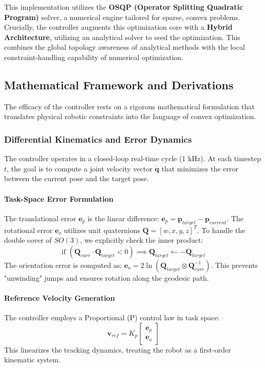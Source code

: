 \documentclass[12pt,a4paper]{report}
\begin{document}
This implementation utilizes the \textbf{OSQP (Operator Splitting Quadratic Program)} solver, a numerical engine tailored for sparse, convex problems. Crucially, the controller augments this optimization core with a \textbf{Hybrid Architecture}, utilizing an analytical solver \cite{EAIK} to seed the optimization. This combines the global topology awareness of analytical methods with the local constraint-handling capability of numerical optimization.

\subsection{Mathematical Framework and Derivations}
The efficacy of the controller rests on a rigorous mathematical formulation that translates physical robotic constraints into the language of convex optimization.

\subsubsection{Differential Kinematics and Error Dynamics}
The controller operates in a closed-loop real-time cycle (1 kHz). At each timestep $t$, the goal is to compute a joint velocity vector $\dot{\mathbf{q}}$ that minimizes the error between the current pose and the target pose.

\paragraph{Task-Space Error Formulation}
The translational error $\mathbf{e}_p$ is the linear difference: $\mathbf{e}_p = \mathbf{p}_{target} - \mathbf{p}_{current}$. The rotational error $\mathbf{e}_o$ utilizes unit quaternions $\mathbf{Q} = [w, x, y, z]^T$. To handle the double cover of $SO(3)$, we explicitly check the inner product:
\begin{equation}
    \text{if } (\mathbf{Q}_{curr} \cdot \mathbf{Q}_{target} < 0) \implies \mathbf{Q}_{target} \leftarrow -\mathbf{Q}_{target}
\end{equation}
The orientation error is computed as: $\mathbf{e}_o = 2 \ln(\mathbf{Q}_{target} \otimes \mathbf{Q}_{curr}^{-1})$. This prevents "unwinding" jumps and ensures rotation along the geodesic path.

\paragraph{Reference Velocity Generation}
The controller employs a Proportional (P) control law in task space:
\begin{equation}
    \mathbf{v}_{ref} = K_p \begin{bmatrix} \mathbf{e}_p \\ \mathbf{e}_o \end{bmatrix}
\end{equation}
This linearizes the tracking dynamics, treating the robot as a first-order kinematic system.
\end{document}
